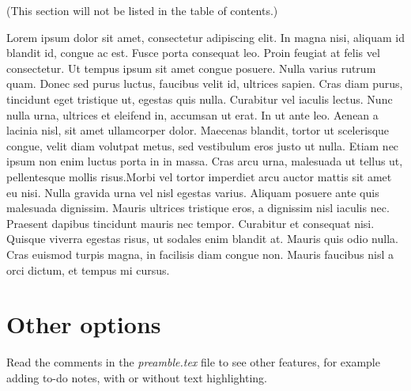 (This section will not be listed in the table of contents.)

Lorem ipsum dolor sit amet, consectetur adipiscing elit. In magna nisi, aliquam id blandit id, congue ac est. Fusce porta consequat leo. Proin feugiat at felis vel consectetur. Ut tempus ipsum sit amet congue posuere. Nulla varius rutrum quam. Donec sed purus luctus, faucibus velit id, ultrices sapien. Cras diam purus, tincidunt eget tristique ut, egestas quis nulla. Curabitur vel iaculis lectus. Nunc nulla urna, ultrices et eleifend in, accumsan ut erat. In ut ante leo. Aenean a lacinia nisl, sit amet ullamcorper dolor. Maecenas blandit, tortor ut scelerisque congue, velit diam volutpat metus, sed vestibulum eros justo ut nulla. Etiam nec ipsum non enim luctus porta in in massa. Cras arcu urna, malesuada ut tellus ut, pellentesque mollis risus.Morbi vel tortor imperdiet arcu auctor mattis sit amet eu nisi. Nulla gravida urna vel nisl egestas varius. Aliquam posuere ante quis malesuada dignissim. Mauris ultrices tristique eros, a dignissim nisl iaculis nec. Praesent dapibus tincidunt mauris nec tempor. Curabitur et consequat nisi. Quisque viverra egestas risus, ut sodales enim blandit at. Mauris quis odio nulla. Cras euismod turpis magna, in facilisis diam congue non. Mauris faucibus nisl a orci dictum, et tempus mi cursus.

\section{Other options}

Read the comments in the \textit{preamble.tex} file to see other features, for example adding to-do notes, with or without text highlighting.

